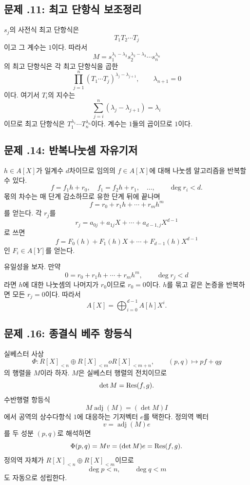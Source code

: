 \subsection*{문제 \thechapter.11: 최고 단항식 보조정리}

\begin{solution}
$s_j$의 사전식 최고 단항식은
\[
  T_1T_2\cdots T_j
\]
이고 그 계수는 $1$이다. 따라서
\[
  M=s_1^{\lambda_1-\lambda_2}
  s_2^{\lambda_2-\lambda_3}\cdots s_n^{\lambda_n}
\]
의 최고 단항식은 각 최고 단항식을 곱한
\[
  \prod_{j=1}^n
  (T_1\cdots T_j)^{\lambda_j-\lambda_{j+1}},
  \qquad \lambda_{n+1}=0
\]
이다. 여기서 $T_i$의 지수는
\[
  \sum_{j=i}^n(\lambda_j-\lambda_{j+1})
  =\lambda_i
\]
이므로 최고 단항식은 $T_1^{\lambda_1}\cdots T_n^{\lambda_n}$이다. 계수는 $1$들의 곱이므로 $1$이다.
\end{solution}

\subsection*{문제 \thechapter.14: 반복나눗셈 자유기저}

\begin{solution}
$h\in A[X]$가 일계수 $d$차이므로 임의의 $f\in A[X]$에 대해 나눗셈 알고리즘을 반복할 수 있다.
\[
  f=f_1h+r_0,
  \quad
  f_1=f_2h+r_1,
  \quad\dots,
  \qquad \deg r_i<d.
\]
몫의 차수는 매 단계 감소하므로 유한 단계 뒤에 끝나며
\[
  f=r_0+r_1h+\cdots+r_mh^m
\]
를 얻는다. 각 $r_j$를
\[
  r_j=a_{0j}+a_{1j}X+\cdots+a_{d-1,j}X^{d-1}
\]
로 쓰면
\[
  f=F_0(h)+F_1(h)X+\cdots+F_{d-1}(h)X^{d-1}
\]
인 $F_i\in A[Y]$를 얻는다.

유일성을 보자. 만약
\[
  0=r_0+r_1h+\cdots+r_mh^m,
  \qquad \deg r_j<d
\]
라면 $h$에 대한 나눗셈의 나머지가 $r_0$이므로 $r_0=0$이다. $h$를 묶고 같은 논증을 반복하면 모든 $r_j=0$이다. 따라서
\[
  A[X]=\bigoplus_{i=0}^{d-1}A[h]X^i.
\]
\end{solution}

\subsection*{문제 \thechapter.16: 종결식 베주 항등식}

\begin{solution}
실베스터 사상
\[
  \Phi:R[X]_{<n}\oplus R[X]_{<m}	o R[X]_{<m+n},
  \qquad (p,q)\mapsto pf+qg
\]
의 행렬을 $M$이라 하자. $M$은 실베스터 행렬의 전치이므로
\[
  \det M=\operatorname{Res}(f,g).
\]
수반행렬 항등식
\[
  M\operatorname{adj}(M)=(\det M)I
\]
에서 공역의 상수다항식 $1$에 대응하는 기저벡터 $e$를 택한다. 정의역 벡터
\[
  v=\operatorname{adj}(M)e
\]
를 두 성분 $(p,q)$로 해석하면
\[
  \Phi(p,q)=Mv=(\det M)e=\operatorname{Res}(f,g).
\]
정의역 자체가 $R[X]_{<n}\oplus R[X]_{<m}$이므로
\[
  \deg p<n,
  \qquad
  \deg q<m
\]
도 자동으로 성립한다.
\end{solution}
